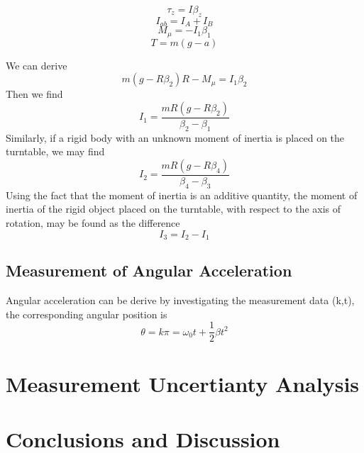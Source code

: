 \documentclass[12pt,a4paper]{article}
\begin{document}
$$ \tau_z = I\beta_z $$
$$ I_{ab} = I_A + I_B $$
$$ M_\mu = -I_1\beta_1 $$
$$ T = m(g-a)$$

We can derive
$$ m(g-R\beta_2)R-M_\mu=I_1\beta_2 $$
Then we find
$$ I_1=\frac{mR(g-R\beta_2)}{\beta_2-\beta_1} $$
Similarly, if a rigid body with an unknown moment of inertia is placed on the
turntable, we may find 
$$ I_2=\frac{mR(g-R\beta_4)}{\beta_4-\beta_3} $$
Using the fact that the moment of inertia is an additive quantity, the moment of
inertia of the rigid object placed on the turntable, with respect to the axis of
rotation, may be found as the difference 
$$ I_3 = I_2 - I_1 $$

\subsection{Measurement of Angular Acceleration}
Angular acceleration can be derive by investigating the measurement data (k,t),
the corresponding angular position is
$$ \theta = k\pi = \omega_0 t + \frac{1}{2}\beta t^2 $$

\section{Measurement Uncertianty Analysis}

\section{Conclusions and Discussion}

\end{document}
